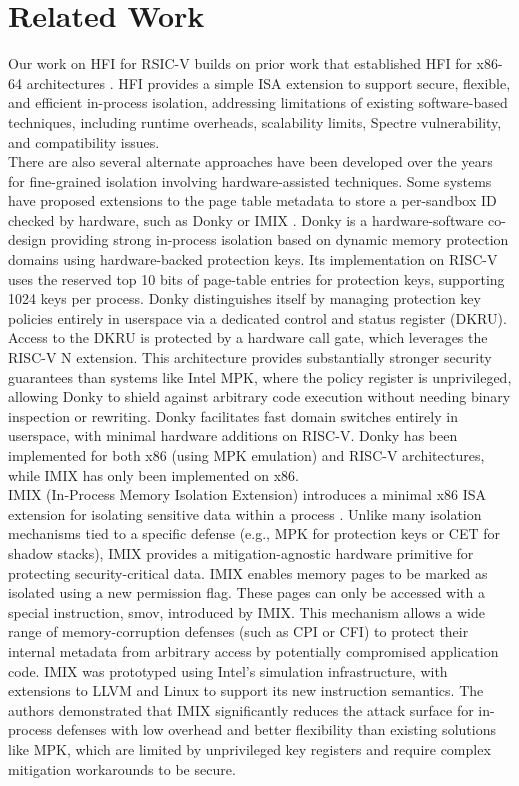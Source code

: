 \documentclass[conference,compsoc]{IEEEtran}
\begin{document}
\section{Related Work}
Our work on HFI for RSIC-V builds on prior work that established HFI for x86-64 architectures \cite{HFI}. HFI provides a simple ISA extension to support secure, flexible, and efficient in-process isolation, addressing limitations of existing software-based techniques, including runtime overheads, scalability limits, Spectre vulnerability, and compatibility issues.\\
There are also several alternate approaches have been developed over the years for fine-grained isolation involving hardware-assisted techniques. Some systems have proposed extensions to the page table metadata to store a per-sandbox ID checked by hardware, such as Donky \cite{Donky} or IMIX \cite{IMIX}. Donky is a hardware-software co-design providing strong in-process isolation based on dynamic memory protection domains using hardware-backed protection keys. Its implementation on RISC-V uses the reserved top 10 bits of page-table entries for protection keys, supporting 1024 keys per process. Donky distinguishes itself by managing protection key policies entirely in userspace via a dedicated control and status register (DKRU). Access to the DKRU is protected by a hardware call gate, which leverages the RISC-V N extension. This architecture provides substantially stronger security guarantees than systems like Intel MPK, where the policy register is unprivileged, allowing Donky to shield against arbitrary code execution without needing binary inspection or rewriting. Donky facilitates fast domain switches entirely in userspace, with minimal hardware additions on RISC-V. Donky has been implemented for both x86 (using MPK emulation) and RISC-V architectures, while IMIX has only been implemented on x86.\\
IMIX (In-Process Memory Isolation Extension) introduces a minimal x86 ISA extension for isolating sensitive data within a process \cite{IMIX}. Unlike many isolation mechanisms tied to a specific defense (e.g., MPK for protection keys or CET for shadow stacks), IMIX provides a mitigation-agnostic hardware primitive for protecting security-critical data. IMIX enables memory pages to be marked as isolated using a new permission flag. These pages can only be accessed with a special instruction, smov, introduced by IMIX. This mechanism allows a wide range of memory-corruption defenses (such as CPI or CFI) to protect their internal metadata from arbitrary access by potentially compromised application code. IMIX was prototyped using Intel’s simulation infrastructure, with extensions to LLVM and Linux to support its new instruction semantics. The authors demonstrated that IMIX significantly reduces the attack surface for in-process defenses with low overhead and better flexibility than existing solutions like MPK, which are limited by unprivileged key registers and require complex mitigation workarounds to be secure.\\
\end{document}
